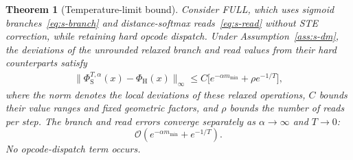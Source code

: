 \documentclass[letterpaper]{article} %
\newtheorem{theorem}{Theorem}
\begin{document}
\begin{theorem}[Temperature-limit bound]
\label{thm:s-limit}
Consider FULL, which uses sigmoid
branches~\eqref{eq:s-branch} and distance-softmax
reads~\eqref{eq:s-read} without STE correction,
while retaining hard opcode dispatch.
Under Assumption~\ref{ass:s-dm}, the deviations
of the unrounded relaxed branch and read values
from their hard counterparts satisfy
\begin{equation}
\begin{aligned}
\big\|\Phi_{\mathrm{S}}^{T,\alpha}(x)
-\Phi_{\mathrm{H}}(x)\big\|_\infty
\le C\big[
e^{-\alpha m_{\min}}
+\rho e^{-1/T}\big],
\end{aligned}
\label{eq:s-bound}
\end{equation}
where the norm denotes the local deviations of
these relaxed operations, $C$ bounds their
value ranges and fixed geometric factors, and
$\rho$ bounds the number of reads per step.
The branch and read errors converge separately
as $\alpha\to\infty$ and $T\to0$:
\[
\mathcal{O}(e^{-\alpha m_{\min}}+e^{-1/T}).
\]
No opcode-dispatch term occurs.
\end{theorem}
\end{document}
